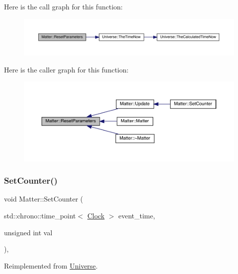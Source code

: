 Here is the call graph for this function\+:\nopagebreak
\begin{figure}[H]
\begin{center}
\leavevmode
\includegraphics[width=350pt]{class_matter_adfd93d323e43d09fa8d8b7cdd2258611_cgraph}
\end{center}
\end{figure}
Here is the caller graph for this function\+:
\nopagebreak
\begin{figure}[H]
\begin{center}
\leavevmode
\includegraphics[width=350pt]{class_matter_adfd93d323e43d09fa8d8b7cdd2258611_icgraph}
\end{center}
\end{figure}
\mbox{\label{class_matter_a514b4a64589eb3fbc3db6b3b356bd687}} 
\subsubsection{\texorpdfstring{Set\+Counter()}{SetCounter()}}
{\footnotesize\ttfamily void Matter\+::\+Set\+Counter (\begin{DoxyParamCaption}\item[{std\+::chrono\+::time\+\_\+point$<$ \hyperlink{universe_8h_a0ef8d951d1ca5ab3cfaf7ab4c7a6fd80}{Clock} $>$}]{event\+\_\+time,  }\item[{unsigned int}]{val }\end{DoxyParamCaption})\hspace{0.3cm}{\ttfamily [inline]}, {\ttfamily [virtual]}}



Reimplemented from \hyperlink{class_universe_aa22202ae740eb1355529afcb13285e91}{Universe}.



